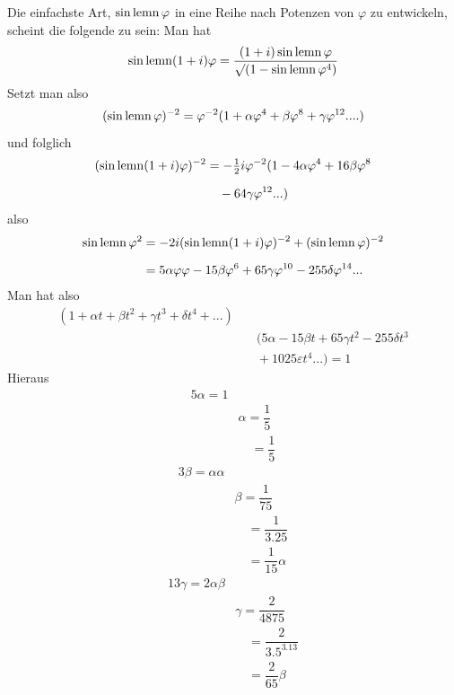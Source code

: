 Die einfachste Art, $\operatorname{sin\,lemn}\varphi$ in eine Reihe nach Potenzen von $\varphi$ zu entwickeln, scheint die folgende zu sein: Man hat
\[
\operatorname{sin\,lemn}(1+i)\varphi=\dfrac{(1+i)\operatorname{sin\,lemn}\varphi}{\surd(1-\operatorname{sin\,lemn}\varphi^4)}
\]
Setzt man also
\[
(\operatorname{sin\,lemn}\varphi)^{-2}=\varphi^{-2}(1+\alpha\varphi^4+\beta\varphi^8+\gamma\varphi^{12}\mathord{.}\mathord{.}\mathord{.}\mathord{.})
\]
und folglich
\[
\begin{aligned}(\operatorname{sin\,lemn}(1+i)\varphi)^{-2}&=-\tfrac12i\varphi^{-2}(1-4\alpha\varphi^4+16\beta\varphi^8\\[6pt]&\quad{}-64\gamma\varphi^{12}\mathord{.}\mathord{.}\mathord{.})\end{aligned}
\]
also
\[
\begin{aligned}
\operatorname{sin\,lemn}\varphi^2&=-2i(\operatorname{sin\,lemn}(1+i)\varphi)^{-2}+(\operatorname{sin\,lemn}\varphi)^{-2}\\[6pt]
&=5\alpha\varphi\varphi-15\beta\varphi^6+65\gamma\varphi^{10}-255\delta\varphi^{14}\mathord{.}\mathord{.}\mathord{.}
\end{aligned}
\]
Man hat also
\[
\begin{aligned}(1+\alpha t+\beta t^2+\gamma t^3+\delta t^4+\mathord{.}\mathord{.}\mathord{.})\\[6pt]&\quad(5\alpha-15\beta t+65\gamma t^2-255\delta t^3\\[5pt]&\quad{}+1025\varepsilon t^4\mathord{.}\mathord{.}\mathord{.})=1\end{aligned}
\]
Hieraus
\[
\begin{aligned}5\alpha=1\\[5pt]&\alpha=\dfrac15\\[5pt]&\quad=\dfrac15\end{aligned}
\]
\[
\begin{aligned}3\beta=\alpha\alpha\\[5pt]&\beta=\dfrac1{75}\\[5pt]&\quad=\dfrac1{3.25}\\[5pt]&\quad=\dfrac1{15}\alpha\end{aligned}
\]
\[
\begin{aligned}13\gamma=2\alpha\beta\\[5pt]&\gamma=\dfrac2{4875}\\[5pt]&\quad=\dfrac2{3.5^3.13}\\[5pt]&\quad=\dfrac2{65}\beta\end{aligned}
\]
